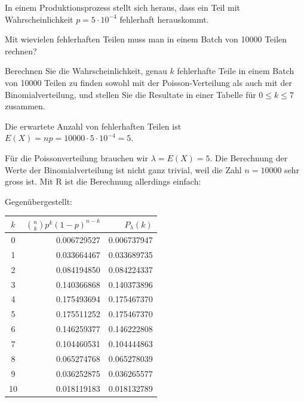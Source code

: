 In einem Produktionsprozess stellt sich heraus, dass ein Teil mit Wahrscheinlichkeit
$p=5\cdot10^{-4}$ fehlerhaft herauskommt.
\begin{teilaufgaben}
\item Mit wievielen fehlerhaften Teilen muss man in einem Batch von 10000 Teilen
rechnen?
\item Berechnen Sie die Wahrscheinlichkeit, genau $k$ fehlerhafte Teile in einem
Batch von 10000 Teilen zu finden sowohl mit der Poisson-Verteilung als auch
mit der Binomialverteilung, und stellen Sie die Resultate in einer Tabelle
für $0\le k\le 7$
zusammen.
\end{teilaufgaben}


\begin{loesung}
\begin{teilaufgaben}
\item Die erwartete Anzahl von fehlerhaften Teilen ist
$E(X)=np=10000\cdot 5\cdot10^{-4}=5$.
\item Für die Poissonverteilung brauchen wir $\lambda=E(X)=5$.
Die Berechnung der Werte der Binomialverteilung ist nicht ganz trivial, weil
die Zahl $n=10000$ sehr gross ist.
Mit R ist die Berechnung allerdings einfach:
\begin{small}
\end{small}
Gegenübergestellt:
\begin{center}
\begin{tabular}{c|rr}
$k$&$\binom{n}{k}p^k(1-p)^{n-k}$&$P_\lambda(k)$\\
\hline
 0&0.006729527& 0.006737947\\
 1&0.033664467& 0.033689735\\
 2&0.084194850& 0.084224337\\
 3&0.140366868& 0.140373896\\
 4&0.175493694& 0.175467370\\
 5&0.175511252& 0.175467370\\
 6&0.146259377& 0.146222808\\
 7&0.104460531& 0.104444863\\
 8&0.065274768& 0.065278039\\
 9&0.036252875& 0.036265577\\
10&0.018119183& 0.018132789\\
\hline
\end{tabular}
\end{center}
\end{teilaufgaben}
\end{loesung}

